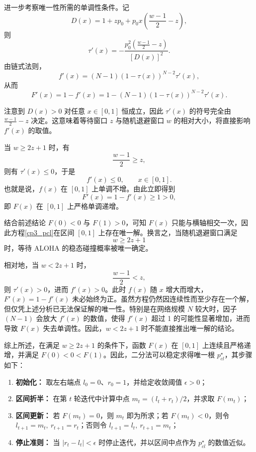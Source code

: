 进一步考察唯一性所需的单调性条件。记
\[
D(x)=1+zp_0+p_0x\left(\frac{w-1}{2}-z\right),
\]
则
\begin{equation}
    \tau'(x)= -\frac{p_0^2\left(\frac{w-1}{2}-z\right)}{[D(x)]^2}.
\end{equation}
由链式法则，
\begin{equation}
    f'(x)=(N-1)\left(1-\tau(x)\right)^{N-2}\tau'(x),
\end{equation}
从而
\begin{equation}
    F'(x)=1-f'(x)
    =1-(N-1)\left(1-\tau(x)\right)^{N-2}\tau'(x).
\end{equation}

注意到 $D(x)>0$ 对任意 $x\in[0,1]$ 恒成立，因此 $\tau'(x)$ 的符号完全由 $\frac{w-1}{2}-z$ 决定。这意味着等待窗口 $z$ 与随机退避窗口 $w$ 的相对大小，将直接影响 $f'(x)$ 的取值。

当 $w\ge 2z+1$ 时，有
\begin{equation}
    \frac{w-1}{2}\ge z,
\end{equation}
则有 $\tau'(x)\le 0$，于是
\begin{equation}
    f'(x)\le 0,\qquad x\in[0,1].
\end{equation}
也就是说，$f(x)$ 在 $[0,1]$ 上单调不增。由此立即得到
\begin{equation}
    F'(x)=1-f'(x)\ge 1>0,
\end{equation}
即 $F(x)$ 在 $[0,1]$ 上严格单调递增。

结合前述结论 $F(0)<0$ 与 $F(1)>0$，可知 $F(x)$ 只能与横轴相交一次，因此方程\eqref{cp3_pcl}在区间 $[0,1]$ 上存在唯一解。换言之，当随机退避窗口满足
\begin{equation}
    w\ge 2z+1
\end{equation}
时，等待 ALOHA 的稳态碰撞概率被唯一确定。

相对地，当 $w<2z+1$ 时，
\begin{equation}
    \frac{w-1}{2}<z,
\end{equation}
则 $\tau'(x)>0$，进而 $f'(x)>0$。此时 $f(x)$ 随 $x$ 增大而增大，$F'(x)=1-f'(x)$ 未必始终为正。虽然方程仍然因连续性而至少存在一个解，但仅凭上述分析已无法保证解的唯一性。特别是在网络规模 $N$ 较大时，因子 $(N-1)$ 会放大 $f'(x)$ 的数值，使得 $f'(x)$ 超过 1 的可能性显著增加，进而导致 $F(x)$ 失去单调性。因此，$w<2z+1$ 时不能直接推出唯一解的结论。

综上所述，在满足 $w\ge 2z+1$ 的条件下，函数 $F(x)$ 在 $[0,1]$ 上连续且严格递增，并满足 $F(0)<0<F(1)$。因此，二分法可以稳定求得唯一根 $p_{cl}^\star$，其步骤如下：
\begin{enumerate}[wide]
    \item \textbf{初始化：} 取左右端点 $l_0=0$、$r_0=1$，并给定收敛阈值 $\epsilon>0$；
    \item \textbf{区间折半：} 在第 $t$ 轮迭代中计算中点 $m_t=(l_t+r_t)/2$，并求取 $F(m_t)$；
    \item \textbf{区间更新：} 若 $F(m_t)=0$，则 $m_t$ 即为所求；若 $F(m_t)<0$，则令 $l_{t+1}=m_t,\ r_{t+1}=r_t$；否则令 $l_{t+1}=l_t,\ r_{t+1}=m_t$；
    \item \textbf{停止准则：} 当 $|r_t-l_t|<\epsilon$ 时停止迭代，并以区间中点作为 $p_{cl}^\star$ 的数值近似。
\end{enumerate}

